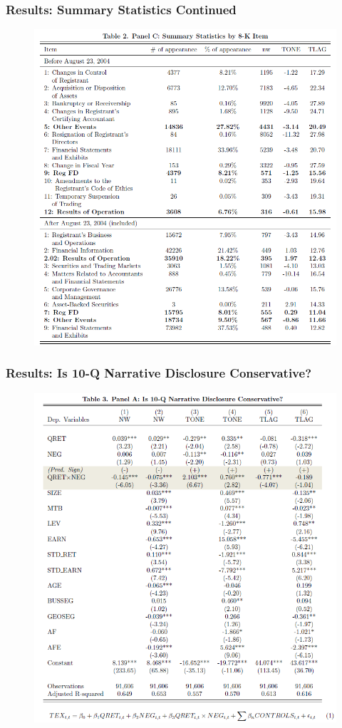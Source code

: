 \documentclass{beamer}
\begin{document}
\begin{frame}
	\frametitle{Results: Summary Statistics Continued}
	\begin{figure}[h]
		\centering
		\includegraphics[width=0.6\linewidth]{tab2panC}
		\label{tab2panC}
	\end{figure}
	
\end{frame}
\begin{frame}
\frametitle{Results: Is 10-Q Narrative Disclosure Conservative?}
	\begin{figure}[h]
		\centering
		\includegraphics[width=0.9\linewidth]{tab3panA}
		\label{tab3panA}
	\end{figure}
\end{frame}
\end{document}
